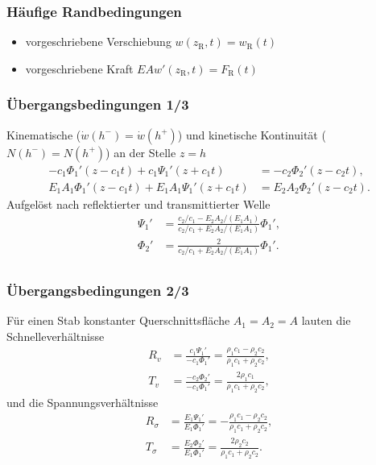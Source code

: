 \begin{frame}
 \frametitle{Häufige Randbedingungen}

\begin{itemize}
 \item vorgeschriebene Verschiebung \quad $w(z_\mathrm{R},t)=w_\mathrm{R}(t)$
 \item vorgeschriebene Kraft \qquad $EA w'(z_\mathrm{R},t)=F_\mathrm{R}(t)$
\end{itemize}

\bigskip



\end{frame} 


\begin{frame}
 \frametitle{Übergangsbedingungen 1/3}

 
Kinematische ($\dot{w}(h^-)=\dot{w}(h^+)$) und kinetische Kontinuität ($N(h^-)=N(h^+)$) an der Stelle $z=h$
\begin{align*}
 -c_1\Phi_1'(z-c_1t) + c_1\Psi_1'(z+c_1t) &= -c_2\Phi_2'(z-c_2t),  \\
 E_1A_1\Phi_1'(z-c_1t) + E_1A_1 \Psi_1'(z+c_1t) &= E_2A_2\Phi_2'(z-c_2t).
\end{align*}
Aufgelöst nach reflektierter und transmittierter Welle
\begin{align*}
 \Psi_1' &= \frac{c_2/c_1 - E_2 A_2/(E_1 A_1)}{c_2/c_1+ E_2 A_2/(E_1 A_1)}\Phi_1',\\
 \Phi_2' &= \frac{2}{c_2/c_1 + E_2 A_2/(E_1 A_1)}\Phi_1'.\\
\end{align*}
\end{frame} 


\begin{frame}
 \frametitle{Übergangsbedingungen 2/3}
  Für einen Stab konstanter Querschnittsfläche $A_1=A_2=A$ lauten die Schnelleverhältnisse
  \begin{align*}
   R_v&=\frac{c_1\Psi_1'}{-c_1\Phi_1'}=\frac{\rho_1 c_1 - \rho_2 c_2}{\rho_1 c_1 + \rho_2 c_2}, \\
   T_v&= \frac{-c_2\Phi_2'}{-c_1\Phi_1'}=\frac{2\rho_1 c_1}{\rho_1 c_1 + \rho_2 c_2 },
  \end{align*}
und die Spannungsverhältnisse
\begin{align*}
   R_\sigma &= \frac{E_1\Psi_1'}{E_1\Phi_1'}=-\frac{\rho_1 c_1 - \rho_2 c_2}{\rho_1 c_1 + \rho_2 c_2}, \\
   T_\sigma &= \frac{E_2\Phi_2'}{E_1\Phi_1'}=\frac{2\rho_2 c_2}{\rho_1 c_1 + \rho_2 c_2 }.
\end{align*}  
\end{frame} 

